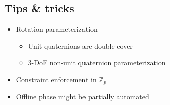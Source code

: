 \subsection{Tips \& tricks}
\begin{frame}
    \begin{itemize}
        \item Rotation parameterization
            \begin{itemize}
                \item Unit quaternions are double-cover
                \item 3-DoF non-unit quaternion parameterization
            \end{itemize}
        \item Constraint enforcement in  $\mathbb{Z}_p$
        \item Offline phase might be partially automated
    \end{itemize}
\end{frame}


